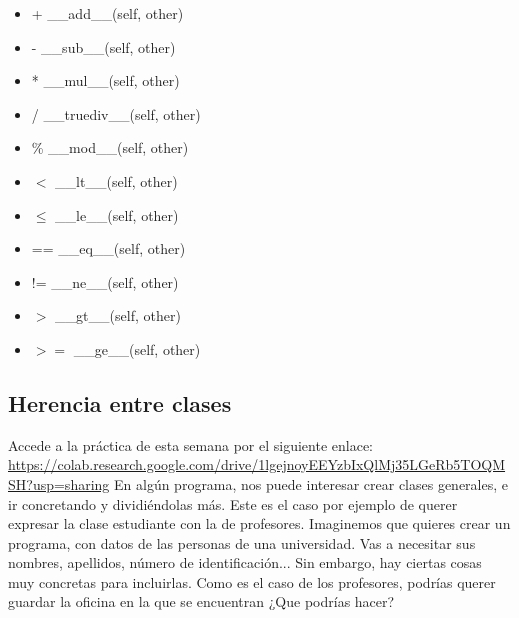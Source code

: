 \documentclass{article}
\begin{document}
\begin{itemize}
    \item + \hspace{3mm} \_\_add\_\_(self, other)
    
    \item- \hspace{3mm}	\_\_sub\_\_(self, other)
    
    \item* \hspace{3mm}	\_\_mul\_\_(self, other)
    
    \item/ \hspace{3mm}	\_\_truediv\_\_(self, other)
    
    \item\% \hspace{3mm} \_\_mod\_\_(self, other)
    
    \item $<$ \hspace{3mm}	\_\_lt\_\_(self, other)
    
    \item $\leq$	\hspace{3mm} \_\_le\_\_(self, other)
    
    \item == \hspace{3mm} \_\_eq\_\_(self, other)
    
    \item != \hspace{3mm} \_\_ne\_\_(self, other)
    
    \item $>$	\hspace{3mm} \_\_gt\_\_(self, other)
    
    
    \item $>=$ \hspace{3mm} \_\_ge\_\_(self, other)
    
\end{itemize}
\subsection{Herencia entre clases}
Accede a la práctica de esta semana por el siguiente enlace: \url{https://colab.research.google.com/drive/1lgejnoyEEYzbIxQlMj35LGeRb5TOQMSH?usp=sharing}
En algún programa, nos puede interesar crear clases generales, e ir concretando y dividiéndolas más. Este es el caso por ejemplo de querer expresar la clase estudiante con la de profesores. Imaginemos que quieres crear un programa, con datos de las personas de una universidad. Vas a necesitar sus nombres, apellidos, número de identificación... Sin embargo, hay ciertas cosas muy concretas para incluirlas. Como es el caso de los profesores, podrías querer guardar la oficina en la que se encuentran ¿Que podrías hacer?
\end{document}
